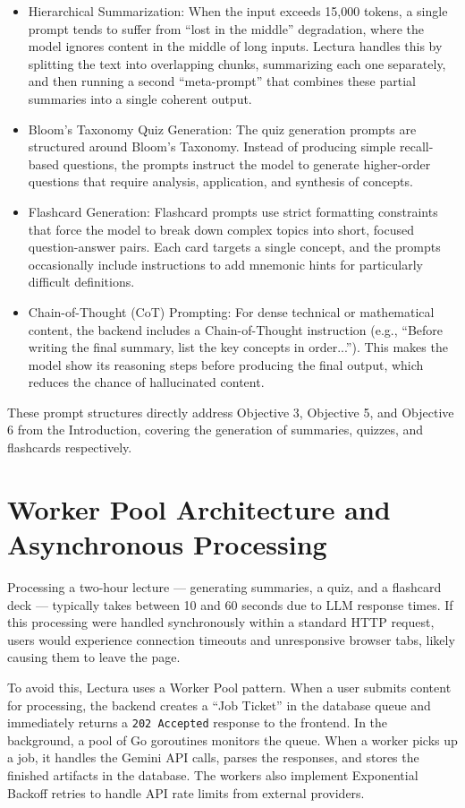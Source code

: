 \begin{itemize}[label=\textendash]
    \item Hierarchical Summarization: When the input exceeds 15,000 tokens, a single prompt tends to suffer from ``lost in the middle'' degradation, where the model ignores content in the middle of long inputs. Lectura handles this by splitting the text into overlapping chunks, summarizing each one separately, and then running a second ``meta-prompt'' that combines these partial summaries into a single coherent output.
    \item Bloom's Taxonomy Quiz Generation: The quiz generation prompts are structured around Bloom's Taxonomy. Instead of producing simple recall-based questions, the prompts instruct the model to generate higher-order questions that require analysis, application, and synthesis of concepts.
    \item Flashcard Generation: Flashcard prompts use strict formatting constraints that force the model to break down complex topics into short, focused question-answer pairs. Each card targets a single concept, and the prompts occasionally include instructions to add mnemonic hints for particularly difficult definitions.
    \item Chain-of-Thought (CoT) Prompting: For dense technical or mathematical content, the backend includes a Chain-of-Thought instruction (e.g., ``Before writing the final summary, list the key concepts in order...''). This makes the model show its reasoning steps before producing the final output, which reduces the chance of hallucinated content.
\end{itemize}

These prompt structures directly address Objective 3, Objective 5, and Objective 6 from the Introduction, covering the generation of summaries, quizzes, and flashcards respectively.

\section{Worker Pool Architecture and Asynchronous Processing}
Processing a two-hour lecture — generating summaries, a quiz, and a flashcard deck — typically takes between 10 and 60 seconds due to LLM response times. If this processing were handled synchronously within a standard HTTP request, users would experience connection timeouts and unresponsive browser tabs, likely causing them to leave the page.

To avoid this, Lectura uses a Worker Pool pattern. When a user submits content for processing, the backend creates a ``Job Ticket'' in the database queue and immediately returns a \texttt{202 Accepted} response to the frontend. In the background, a pool of Go goroutines monitors the queue. When a worker picks up a job, it handles the Gemini API calls, parses the responses, and stores the finished artifacts in the database. The workers also implement Exponential Backoff retries to handle API rate limits from external providers.

